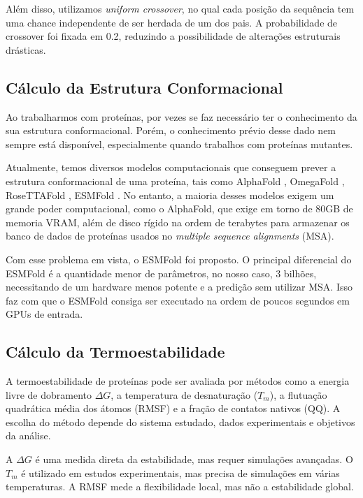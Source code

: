\documentclass[12pt]{extarticle}
\begin{document}
Além disso, utilizamos \textit{uniform crossover}, no qual
cada posição da sequência tem uma chance independente de ser herdada de um
dos pais. A probabilidade de crossover foi fixada em 0.2, reduzindo a
possibilidade de alterações estruturais drásticas.


\label{sec:estrutura_conform}
\subsection{Cálculo da Estrutura Conformacional}

Ao trabalharmos com proteínas, por vezes se faz necessário ter o conhecimento da sua
estrutura conformacional. Porém, o conhecimento prévio desse dado nem sempre está disponível,
especialmente quando trabalhos com proteínas mutantes. 

Atualmente, temos diversos modelos computacionais que conseguem prever a
estrutura conformacional de uma proteína, tais como AlphaFold \cite{alphafold},
OmegaFold \cite{omegafold}, RoseTTAFold \cite{rosettafold}, ESMFold
\cite{esmfold}. No entanto, a maioria desses modelos exigem um grande poder
computacional, como o AlphaFold, que exige em torno de 80GB de memoria VRAM,
além de disco rígido na ordem de terabytes para armazenar os banco de dados de
proteínas usados no \textit{multiple sequence alignments} (MSA).

Com esse problema em vista, o ESMFold foi proposto. O principal diferencial do
ESMFold é a quantidade menor de parâmetros, no nosso caso, 3 bilhões,
necessitando de um hardware menos potente e a predição sem utilizar MSA. Isso
faz com que o ESMFold consiga ser executado na ordem de poucos segundos em GPUs
de entrada.

\label{sec:termoestabilidade}
\subsection{Cálculo da Termoestabilidade}

A termoestabilidade de proteínas pode ser avaliada por métodos como a energia
livre de dobramento $\Delta G$, a temperatura de desnaturação ($T_m$), a flutuação
quadrática média dos átomos (RMSF) e a fração de contatos nativos (QQ). A
escolha do método depende do sistema estudado, dados experimentais e objetivos
da análise.

A $\Delta G$ é uma medida direta da estabilidade, mas requer simulações avançadas. O $T_m$
é utilizado em estudos experimentais, mas precisa de simulações em várias
temperaturas. A RMSF mede a flexibilidade local, mas não a estabilidade global.
\end{document}
